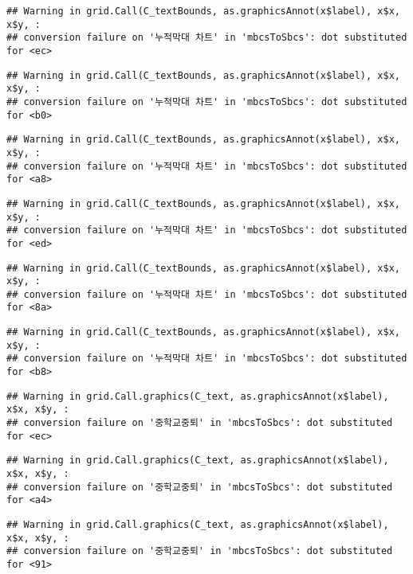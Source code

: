 \documentclass[
]{article}
\begin{document}
\begin{verbatim}
## Warning in grid.Call(C_textBounds, as.graphicsAnnot(x$label), x$x, x$y, :
## conversion failure on '누적막대 차트' in 'mbcsToSbcs': dot substituted for <ec>
\end{verbatim}

\begin{verbatim}
## Warning in grid.Call(C_textBounds, as.graphicsAnnot(x$label), x$x, x$y, :
## conversion failure on '누적막대 차트' in 'mbcsToSbcs': dot substituted for <b0>
\end{verbatim}

\begin{verbatim}
## Warning in grid.Call(C_textBounds, as.graphicsAnnot(x$label), x$x, x$y, :
## conversion failure on '누적막대 차트' in 'mbcsToSbcs': dot substituted for <a8>
\end{verbatim}

\begin{verbatim}
## Warning in grid.Call(C_textBounds, as.graphicsAnnot(x$label), x$x, x$y, :
## conversion failure on '누적막대 차트' in 'mbcsToSbcs': dot substituted for <ed>
\end{verbatim}

\begin{verbatim}
## Warning in grid.Call(C_textBounds, as.graphicsAnnot(x$label), x$x, x$y, :
## conversion failure on '누적막대 차트' in 'mbcsToSbcs': dot substituted for <8a>
\end{verbatim}

\begin{verbatim}
## Warning in grid.Call(C_textBounds, as.graphicsAnnot(x$label), x$x, x$y, :
## conversion failure on '누적막대 차트' in 'mbcsToSbcs': dot substituted for <b8>
\end{verbatim}

\begin{verbatim}
## Warning in grid.Call.graphics(C_text, as.graphicsAnnot(x$label), x$x, x$y, :
## conversion failure on '중학교중퇴' in 'mbcsToSbcs': dot substituted for <ec>
\end{verbatim}

\begin{verbatim}
## Warning in grid.Call.graphics(C_text, as.graphicsAnnot(x$label), x$x, x$y, :
## conversion failure on '중학교중퇴' in 'mbcsToSbcs': dot substituted for <a4>
\end{verbatim}

\begin{verbatim}
## Warning in grid.Call.graphics(C_text, as.graphicsAnnot(x$label), x$x, x$y, :
## conversion failure on '중학교중퇴' in 'mbcsToSbcs': dot substituted for <91>
\end{verbatim}
\end{document}
